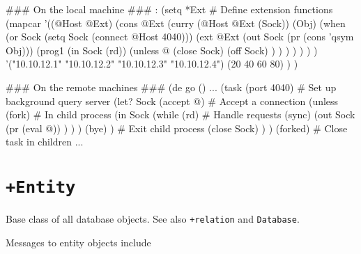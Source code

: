\begin{wideverbatim}
### On the local machine ###
: (setq *Ext  # Define extension functions
   (mapcar
      '((@Host @Ext)
         (cons @Ext
            (curry (@Host @Ext (Sock)) (Obj)
               (when (or Sock (setq Sock (connect @Host 4040)))
                  (ext @Ext
                     (out Sock (pr (cons 'qsym Obj)))
                     (prog1 (in Sock (rd))
                        (unless @
                           (close Sock)
                           (off Sock) ) ) ) ) ) ) )
      '("10.10.12.1" "10.10.12.2" "10.10.12.3" "10.10.12.4")
      (20 40 60 80) ) )

### On the remote machines ###
(de go ()
   ...
   (task (port 4040)                      # Set up background query server
      (let? Sock (accept @)               # Accept a connection
         (unless (fork)                   # In child process
            (in Sock
               (while (rd)                # Handle requests
                  (sync)
                  (out Sock
                     (pr (eval @)) ) ) )
            (bye) )                       # Exit child process
         (close Sock) ) )
   (forked)                               # Close task in children
   ...
\end{wideverbatim}

 
\section*{\texttt{+Entity}}
\label{sec:func-ref-E-+Entity}


Base class of all database objects. See also \texttt{+relation} and \texttt{Database}.

Messages to entity objects include


